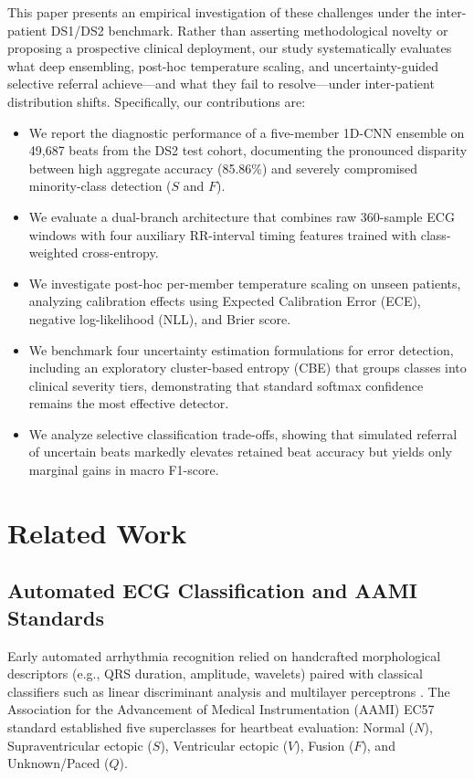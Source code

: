 \documentclass[conference]{IEEEtran}
\begin{document}
This paper presents an empirical investigation of these challenges under the inter-patient DS1/DS2 benchmark. Rather than asserting methodological novelty or proposing a prospective clinical deployment, our study systematically evaluates what deep ensembling, post-hoc temperature scaling, and uncertainty-guided selective referral achieve—and what they fail to resolve—under inter-patient distribution shifts. Specifically, our contributions are:
\begin{itemize}
    \item We report the diagnostic performance of a five-member 1D-CNN ensemble on 49,687 beats from the DS2 test cohort, documenting the pronounced disparity between high aggregate accuracy (85.86\%) and severely compromised minority-class detection ($S$ and $F$).
    \item We evaluate a dual-branch architecture that combines raw 360-sample ECG windows with four auxiliary RR-interval timing features trained with class-weighted cross-entropy.
    \item We investigate post-hoc per-member temperature scaling on unseen patients, analyzing calibration effects using Expected Calibration Error (ECE), negative log-likelihood (NLL), and Brier score.
    \item We benchmark four uncertainty estimation formulations for error detection, including an exploratory cluster-based entropy (CBE) that groups classes into clinical severity tiers, demonstrating that standard softmax confidence remains the most effective detector.
    \item We analyze selective classification trade-offs, showing that simulated referral of uncertain beats markedly elevates retained beat accuracy but yields only marginal gains in macro F1-score.
\end{itemize}

\section{Related Work}

\subsection{Automated ECG Classification and AAMI Standards}
Early automated arrhythmia recognition relied on handcrafted morphological descriptors (e.g., QRS duration, amplitude, wavelets) paired with classical classifiers such as linear discriminant analysis \cite{b3} and multilayer perceptrons \cite{b14}. The Association for the Advancement of Medical Instrumentation (AAMI) EC57 standard \cite{b6} established five superclasses for heartbeat evaluation: Normal ($N$), Supraventricular ectopic ($S$), Ventricular ectopic ($V$), Fusion ($F$), and Unknown/Paced ($Q$).
\end{document}
